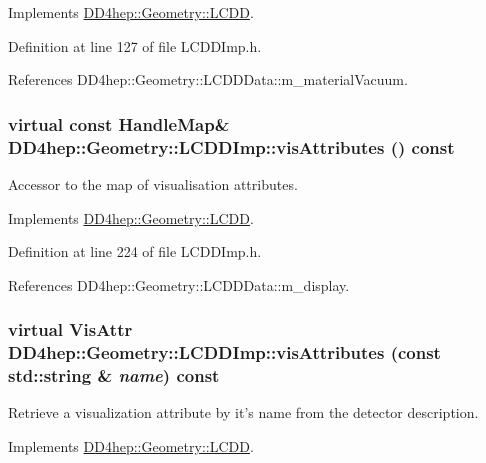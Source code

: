 Implements \hyperlink{class_d_d4hep_1_1_geometry_1_1_l_c_d_d_adf89eaa970c7c23b6896f79a6ad28b7f}{DD4hep::Geometry::LCDD}.

Definition at line 127 of file LCDDImp.h.

References DD4hep::Geometry::LCDDData::m\_\-materialVacuum.\hypertarget{class_d_d4hep_1_1_geometry_1_1_l_c_d_d_imp_a7ba04b265420787088b76beea40c5733}{
\subsubsection[{visAttributes}]{\setlength{\rightskip}{0pt plus 5cm}virtual const {\bf HandleMap}\& DD4hep::Geometry::LCDDImp::visAttributes () const}}
\label{class_d_d4hep_1_1_geometry_1_1_l_c_d_d_imp_a7ba04b265420787088b76beea40c5733}


Accessor to the map of visualisation attributes. 

Implements \hyperlink{class_d_d4hep_1_1_geometry_1_1_l_c_d_d_abb60505e37d62147725d126cb21d171b}{DD4hep::Geometry::LCDD}.

Definition at line 224 of file LCDDImp.h.

References DD4hep::Geometry::LCDDData::m\_\-display.\hypertarget{class_d_d4hep_1_1_geometry_1_1_l_c_d_d_imp_a18c14707abd2efd108fa6ec686c74ebd}{
\subsubsection[{visAttributes}]{\setlength{\rightskip}{0pt plus 5cm}virtual {\bf VisAttr} DD4hep::Geometry::LCDDImp::visAttributes (const std::string \& {\em name}) const}}
\label{class_d_d4hep_1_1_geometry_1_1_l_c_d_d_imp_a18c14707abd2efd108fa6ec686c74ebd}


Retrieve a visualization attribute by it's name from the detector description. 

Implements \hyperlink{class_d_d4hep_1_1_geometry_1_1_l_c_d_d_a449330acbb5a5d6ba6f1fa2d97cea338}{DD4hep::Geometry::LCDD}.

